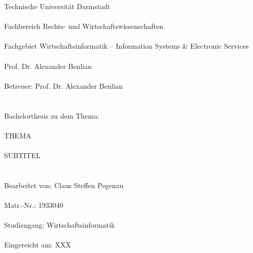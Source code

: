 %
%
%
%

\singlespacing 
\noindent Technische Universität Darmstadt \\\\
Fachbereich Rechts- und Wirtschaftswissenschaften \\\\
Fachgebiet Wirtschaftsinformatik -- Information Systems \& Electronic Services \\\\
Prof. Dr. Alexander Benlian \\\\
Betreuer: Prof. Dr. Alexander Benlian \\\\
\\
Bachelorthesis zu dem Thema: \\\\
\lbrack THEMA\rbrack \\\\
\lbrack SUBTITEL\rbrack \\\\
\\
Bearbeitet von: Claus Steffen Pegenau \\\\
Matr.-Nr.: 1933040 \\\\
Studiengang: Wirtschaftsinformatik \\\\
Eingereicht am: \lbrack XXX\rbrack \\\\

\onehalfspacing

\setcounter{page}{2}
